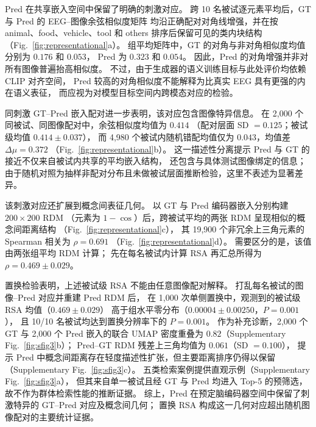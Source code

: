 \documentclass[a4paper,11pt]{article}
\begin{document}
Pred 在共享嵌入空间中保留了明确的刺激对应。
跨 10 名被试逐元素平均后，GT 与 Pred 的 EEG--图像余弦相似度矩阵
均沿正确配对对角线增强，并在按 animal、food、vehicle、tool 和 others
排序后保留可见的类内块结构（Fig.~\ref{fig:representational}a）。
组平均矩阵中，GT 的对角与非对角相似度均值分别为 $0.176$ 和 $0.053$，
Pred 为 $0.323$ 和 $0.054$。
因此，Pred 的对角增强并非对所有图像普遍抬高相似度。
不过，由于生成器的语义训练目标与此处评价均依赖 CLIP 对齐空间，
Pred 较高的对角相似度不能解释为比真实 EEG 具有更强的内在语义表征，
而应视为对模型目标空间内跨模态对应的检验。

同刺激 GT--Pred 嵌入配对进一步表明，该对应包含图像特异信息。
在 2,000 个同被试、同图像配对中，余弦相似度均值为 $0.414$
（配对层面 SD $=0.125$；被试级均值 $0.414\pm0.037$），
而 4,980 个被试内随机错配均值仅为 $0.043$，均值差 $\Delta\mu=0.372$
（Fig.~\ref{fig:representational}b）。
这一描述性分离提示 Pred 与 GT 的接近不仅来自被试内共享的平均嵌入结构，
还包含与具体测试图像绑定的信息；
由于随机对照为抽样非配对分布且未做被试层面推断检验，这里不表述为显著差异。

该刺激对应还扩展到概念间表征几何。
以 GT 与 Pred 编码器嵌入分别构建 $200\times200$ RDM
（元素为 $1-\cos$）后，跨被试平均的两张 RDM 呈现相似的概念间距离结构
（Fig.~\ref{fig:representational}c），
其 19,900 个非冗余上三角元素的 Spearman 相关为 $\rho=0.691$
（Fig.~\ref{fig:representational}d）。
需要区分的是，该值由两张组平均 RDM 计算；
先在每名被试内计算 RSA 再汇总所得为 $\rho=0.469\pm0.029$。

置换检验表明，上述被试级 RSA 不能由任意图像配对解释。
打乱每名被试的图像--Pred 对应并重建 Pred RDM 后，
在 1,000 次单侧置换中，观测到的被试级 RSA 均值（$0.469\pm0.029$）
高于组水平零分布（$0.00004\pm0.00250$，$P=0.001$），
且 10/10 名被试均达到置换分辨率下的 $P=0.001$。
作为补充诊断，2,000 个 GT 与 2,000 个 Pred 嵌入的联合 UMAP
密度重叠为 $0.82$（Supplementary Fig.~\ref{fig:sfig3}b）；
Pred--GT RDM 残差上三角均值为 $0.061$（SD $=0.100$），
提示 Pred 中概念间距离存在轻度描述性扩张，但主要距离排序仍得以保留
（Supplementary Fig.~\ref{fig:sfig3}c）。
五类检索案例提供直观示例（Supplementary Fig.~\ref{fig:sfig3}a），
但其来自单一被试且经 GT 与 Pred 均进入 Top-5 的预筛选，
故不作为群体检索性能的推断证据。
综上，Pred 在预定脑编码器空间中保留了刺激特异的 GT--Pred 对应及概念间几何；
置换 RSA 构成这一几何对应超出随机图像配对的主要统计证据。
\end{document}
